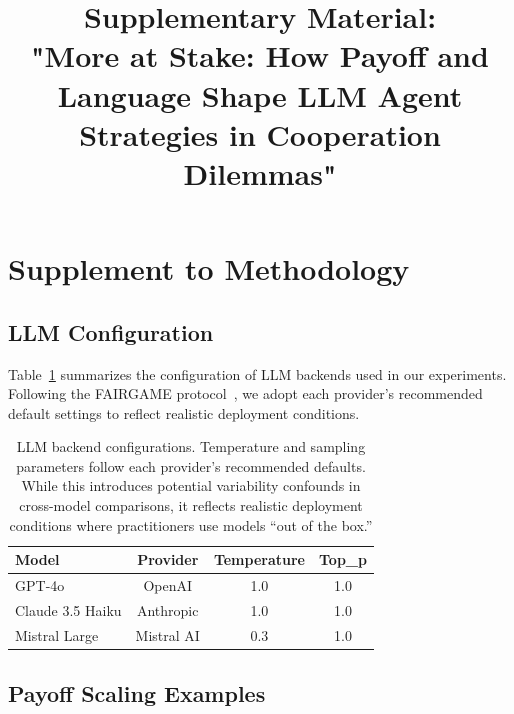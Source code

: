 \documentclass{article}
\title{Supplementary Material: \\ "More at Stake: How Payoff and Language Shape LLM Agent Strategies in Cooperation Dilemmas"}
\date{}
\begin{document}
\maketitle

\setcounter{figure}{0}
\setcounter{equation}{0}
\setcounter{table}{0}
\renewcommand*{\thefigure}{A\arabic{figure}}
\renewcommand*{\theequation}{A\arabic{equation}}
\renewcommand*{\thetable}{A\arabic{table}}



\section{Supplement to Methodology}

\subsection{LLM Configuration}
\label{appendix:llm_config}

Table~\ref{tab:llm_config} summarizes the configuration of LLM backends used in our experiments. Following the FAIRGAME protocol~\cite{buscemi2025fairgame}, we adopt each provider's recommended default settings to reflect realistic deployment conditions.

\begin{table}[ht]
\centering
\footnotesize
\begin{tabular}{lccc}
\toprule
\textbf{Model} & \textbf{Provider} & \textbf{Temperature} & \textbf{Top\_p} \\
\midrule
GPT-4o & OpenAI & 1.0 & 1.0 \\
Claude 3.5 Haiku & Anthropic & 1.0 & 1.0 \\
Mistral Large & Mistral AI & 0.3 & 1.0 \\
\bottomrule
\end{tabular}
\caption{LLM backend configurations. Temperature and sampling parameters follow each provider's recommended defaults. While this introduces potential variability confounds in cross-model comparisons, it reflects realistic deployment conditions where practitioners use models ``out of the box.''}
\label{tab:llm_config}
\end{table}

\subsection{Payoff Scaling Examples}
\label{appendix:payoff_scaling}
\end{document}
